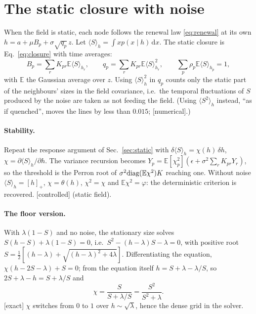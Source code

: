 \documentclass[11pt]{article}
\newcommand{\E}{\mathbb E}
\newcommand{\dd}{\mathrm d}
\newcommand{\exact}{\textsf{\small[exact]}}
\newcommand{\controlled}{\textsf{\small[controlled]}}
\newcommand{\numer}{\textsf{\small[numerical]}}
\begin{document}
\section{The static closure with noise}
\label{sec:noisyclosure}

When the field is static, each node follows the renewal law \eqref{eq:renewal} at its own $h=a+\mu B_p+\sigma\sqrt{q_p}\,z$.
Let $\langle S\rangle_h=\int xp(x\mid h)\,\dd x$.  The static closure is Eq.~\eqref{eq:closure} with time averages:
\begin{equation}
B_p=\sum_rK_{pr}\E\langle S\rangle_{h_r},\qquad q_p=\sum_rK_{pr}\E\langle S\rangle_{h_r}^2,\qquad \sum_p\rho_p\E\langle S\rangle_{h_p}=1,
\end{equation}
with $\E$ the Gaussian average over $z$.  Using $\langle S\rangle^2_h$ in $q_p$ counts only the static part of the neighbours'
sizes in the field covariance, i.e.\ the temporal fluctuations of $S$ produced by the noise are taken as not
feeding the field.  (Using $\langle S^2\rangle_h$ instead, ``as if quenched'', moves the lines by less than $0.015$; \numer.)

\paragraph{Stability.}  Repeat the response argument of Sec.~\ref{sec:static} with $\delta\langle S\rangle_h=\chi(h)\,\delta h$,
$\chi=\partial\langle S\rangle_h/\partial h$.  The variance recursion becomes $Y_p=\E[\chi_p^2](\epsilon+\sigma^2\sum_rK_{pr}Y_r)$, so the
threshold is the Perron root of $\sigma^2{\rm diag}(\E\chi^2)K$ reaching one.  Without noise $\langle S\rangle_h=[h]_+$, $\chi=\theta(h)$,
$\chi^2=\chi$ and $\E\chi^2=\varphi$: the deterministic criterion is recovered.  \controlled{} (static field).

\paragraph{The floor version.}  With $\lambda(1-S)$ and no noise, the stationary size solves $S(h-S)+\lambda(1-S)=0$, i.e.\
$S^2-(h-\lambda)S-\lambda=0$, with positive root $S=\tfrac12[(h-\lambda)+\sqrt{(h-\lambda)^2+4\lambda}]$.  Differentiating the
equation, $\chi(h-2S-\lambda)+S=0$; from the equation itself $h=S+\lambda-\lambda/S$, so $2S+\lambda-h=S+\lambda/S$ and
\begin{equation}
\chi=\frac{S}{S+\lambda/S}=\frac{S^2}{S^2+\lambda}.
\end{equation}
\exact{}  $\chi$ switches from $0$ to $1$ over $h\sim\sqrt\lambda$, hence the dense grid in the solver.
\end{document}
